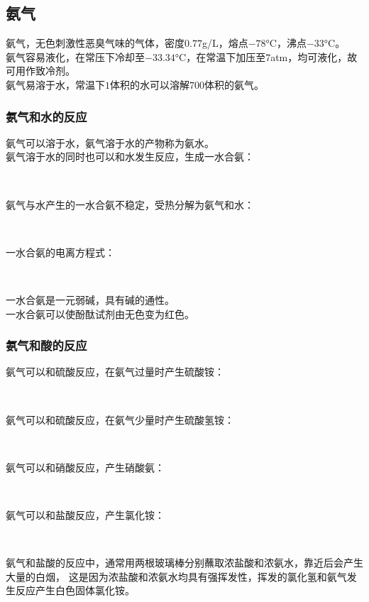 \documentclass[UTF8]{ctexart}
\begin{document}
\newpage

\subsection{氨气}
    氨气，无色刺激性恶臭气味的气体，密度$0.77$\si{g/L}，熔点$-78$\si{\degreeCelsius}，沸点$-33$\si{\degreeCelsius}。\\[3mm]
    氨气容易液化，在常压下冷却至$-33.34$\si{\degreeCelsius}，在常温下加压至$7$\si{atm}，均可液化，故可用作致冷剂。\\[3mm]
    氨气易溶于水，常温下$1$体积的水可以溶解$700$体积的氨气。

\subsubsection{氨气和水的反应}
    氨气可以溶于水，氨气溶于水的产物称为氨水。\\[3mm]
    氨气溶于水的同时也可以和水发生反应，生成一水合氨：
    \begin{center}
        \\[6mm]
    \end{center}
    氨气与水产生的一水合氨不稳定，受热分解为氨气和水：
    \begin{center}
        ~\\[6mm]
    \end{center}
    一水合氨的电离方程式：
    \begin{center}
        \\[6mm]
    \end{center}
    一水合氨是一元弱碱，具有碱的通性。\\[3mm]
    一水合氨可以使酚酞试剂由无色变为红色。

\subsubsection{氨气和酸的反应}
    氨气可以和硫酸反应，在氨气过量时产生硫酸铵：
    \begin{center}
        \\[6mm]
    \end{center}
    氨气可以和硫酸反应，在氨气少量时产生硫酸氢铵：
    \begin{center}
        \\[6mm]
    \end{center}
    氨气可以和硝酸反应，产生硝酸氨：
    \begin{center}
        \\[6mm]
    \end{center}
    氨气可以和盐酸反应，产生氯化铵：
    \begin{center}
        \\[6mm]
    \end{center}
    氨气和盐酸的反应中，通常用两根玻璃棒分别蘸取浓盐酸和浓氨水，靠近后会产生大量的白烟，
    这是因为浓盐酸和浓氨水均具有强挥发性，挥发的氯化氢和氨气发生反应产生白色固体氯化铵。
\end{document}
